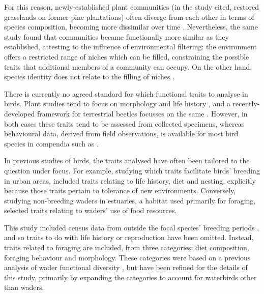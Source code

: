 \documentclass[12pt,a4paper]{book}
\begin{document}
For this reason, newly-established plant communities (in the study cited, restored grasslands on former pine plantations) often diverge from each other in terms of species composition, becoming more dissimilar over time \citep{Helsen2012}. Nevertheless, the same study found that communities became functionally more similar as they established, attesting to the influence of environmental filtering: the environment offers a restricted range of niches which can be filled, constraining the possible traits that additional members of a community can occupy. On the other hand, species identity does not relate to the filling of niches \citep{Helsen2012}.

There is currently no agreed standard for which functional traits to analyse in birds. Plant studies tend to focus on morphology and life history \citep[e.g.][]{Helsen2012}, and a recently-developed framework for terrestrial beetles focusses on the same \citep{Fountain-Jones2015}. However, in both cases these traits tend to be assessed from collected specimens, whereas behavioural data, derived from field observations, is available for most bird species in compendia such as \citet{DelHoyo2016}. 

In previous studies of birds, the traits analysed have often been tailored to the question under focus. For example, studying which traits facilitate birds' breeding in urban areas, \citet{Croci2008} included traits relating to life history, diet and nesting, explicitly because those traits pertain to tolerance of new environments. Conversely, studying non-breeding waders in estuaries, a habitat used primarily for foraging, \citet{Mendez2012} selected traits relating to waders' use of food resources. 

This study included census data from outside the focal species' breeding periods \citep{Nascimento1995}, and so traits to do with life history or reproduction have been omitted. Instead, traits related to foraging are included, from three categories: diet composition, foraging behaviour and morphology. These categories were based on a previous analysis of wader functional diversity \citep{Mendez2012}, but have been refined for the details of this study, primarily by expanding the categories to account for waterbirds other than waders.
\end{document}
